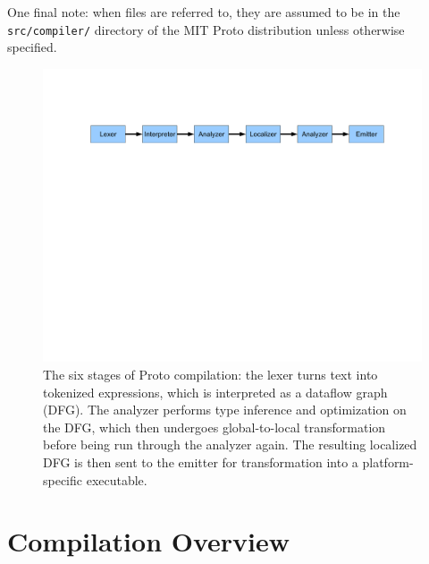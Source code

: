 \documentclass{article}
\newcommand\file[1]{{\tt #1}}
\begin{document}
One final note: when files are referred to, they are assumed to be in the
\file{src/compiler/} directory of the MIT Proto distribution unless otherwise
specified.

\begin{figure}
\centering
\includegraphics[width=5in]{figures/compiler-phases.pdf}
\caption{The six stages of Proto compilation: the lexer turns text into
tokenized expressions, which is interpreted as a dataflow graph (DFG).  The
analyzer performs type inference and optimization on the DFG, which then
undergoes global-to-local transformation before being run through the analyzer
again.  The resulting localized DFG is then sent to the emitter for
transformation into a platform-specific executable.}
\label{f:compiler-stages}
\end{figure}

\section{Compilation Overview}
\end{document}
